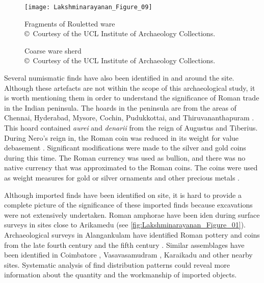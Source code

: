 \begin{figure}[!tb]
\begin{minipage}[b]{\linewidth}
	\texttt{[image: Lakshminarayanan\_Figure\_09]}
	\caption{Fragments of Rouletted ware\\
		{\normalfont\scriptsize\copyright\ Courtesy of the UCL Institute of Archaeology Collections.
	}}
	\label{fig:Lakshminarayanan_Figure_09}
\end{minipage}\par
{}
\hfill
{}

\caption{Coarse ware sherd\\
	{\normalfont\scriptsize\copyright\ Courtesy of the UCL Institute of Archaeology Collections.
}}
\end{figure}
Several numismatic finds have also been identified in and around the site. Although these artefacts are not within the scope of this archaeological study, it is worth mentioning them in order to understand the significance of Roman trade in the Indian peninsula. The hoards in the peninsula are from the areas of Chennai, Hyderabad, Mysore, Cochin, Pudukkottai, and Thiruvananthapuram \parencite{turner2016}. This hoard contained \emph{aurei} and \emph{denarii} from the reign of Augustus and Tiberius. During Nero’s reign in, the Roman coin was reduced in its weight for value debasement \parencite[][68]{lannoye2015}. Significant modifications were made to the silver and gold coins during this time. The Roman currency was used as bullion, and there was no native currency that was approximated to the Roman coins. The coins were used as weight measures for gold or silver ornaments and other precious metals \parencite[][167]{wheeler1955}.

Although imported finds have been identified on site, it is hard to provide a complete picture of the significance of these imported finds because excavations were not extensively undertaken. Roman amphorae have been iden during surface surveys in sites close to Arikamedu (see \cref{fig:Lakshminarayanan_Figure_01}). Archaeological surveys in Alangankulam have identified Roman pottery and coins from the late fourth century and the fifth century\AD
\parencite{kasinathan1994}.
Similar assemblages have been identified in Coimbatore \parencite[][244]{tchernia2016}, Vasavasamudram \parencite[][133]{champakalakshmi1996}, Karaikadu \parencite[][111]{ramachandran1980} and other nearby sites. Systematic analysis of find distribution patterns could reveal more information about the quantity and the workmanship of imported objects.

